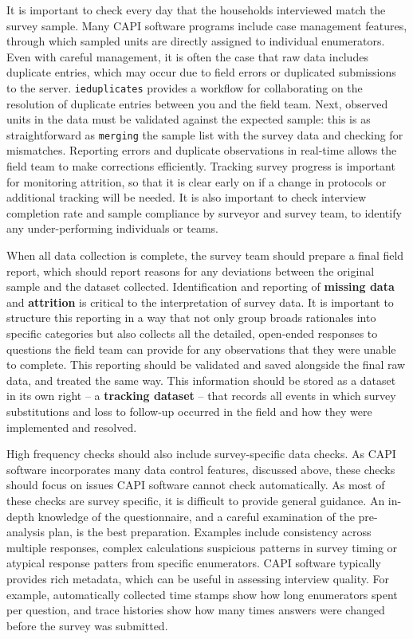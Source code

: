 It is important to check every day that the households interviewed match the survey sample.
Many CAPI software programs include case management features, through which sampled units are directly assigned to individual enumerators.
Even with careful management, it is often the case that raw data includes duplicate entries, which may occur due to field errors or duplicated submissions to the server.
\texttt{ieduplicates}
provides a workflow for collaborating on the resolution of duplicate entries between you and the field team.
Next, observed units in the data must be validated against the expected sample:
this is as straightforward as \texttt{merging} the sample list with the survey data and checking for mismatches.
Reporting errors and duplicate observations in real-time allows the field team to make corrections efficiently.
Tracking survey progress is important for monitoring attrition, so that it is clear early on if a change in protocols or additional tracking will be needed.
It is also important to check interview completion rate and sample compliance by surveyor and survey team, to identify any under-performing individuals or teams.

When all data collection is complete, the survey team should prepare a final field report, which should report reasons for any deviations between the original sample and the dataset collected.
Identification and reporting of \textbf{missing data} and \textbf{attrition} is critical to the interpretation of survey data.
It is important to structure this reporting in a way that not only group broads rationales into specific categories
but also collects all the detailed, open-ended responses to questions the field team can provide for any observations that they were unable to complete.
This reporting should be validated and saved alongside the final raw data, and treated the same way.
This information should be stored as a dataset in its own right -- a \textbf{tracking dataset} -- that records all events in which survey substitutions
and loss to follow-up occurred in the field and how they were implemented and resolved.

High frequency checks should also include survey-specific data checks. As CAPI 
software incorporates many data control features, discussed above, these checks 
should focus on issues CAPI software cannot check automatically. As most of 
these checks are survey specific, it is difficult to provide general guidance. 
An in-depth knowledge of the questionnaire, and a careful examination of the 
pre-analysis plan, is the best preparation. Examples include  consistency 
across multiple responses, complex calculations suspicious patterns in survey 
timing or atypical response patters from specific enumerators. 
CAPI software typically provides rich metadata, which can be useful in 
assessing interview quality. For example, automatically collected time stamps 
show how long enumerators spent per question, and trace histories show how many 
times answers were changed before the survey was submitted.


